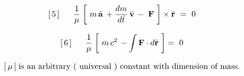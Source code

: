 \documentclass[10pt,fleqn]{article}
\begin{document}
\par \vspace{+0.15em}
\begin{eqnarray*}
\hspace{+1.26em} [\,5\,] \;\;\;\;\;\; \dfrac{1}{\mu} \; \bigg [ \,\, m \, \bar{\mathbf{a}} \, + \dfrac{dm}{d\bar{t}} \, \bar{\mathbf{v}} \, - \; \mathbf{F} \,\, \bigg ] \times \bar{\mathbf{r}} ~=~ 0
\end{eqnarray*}
\par \vspace{+0.15em}
\begin{eqnarray*}
\hspace{+1.26em} [\,6\,] \;\;\;\;\;\; \dfrac{1}{\mu} \; \bigg [ \,\, m \, c^2 \, - \int \mathbf{F} \cdot d\bar{\mathbf{r}} \,\, \bigg ] =~ 0
\end{eqnarray*}
\par \vspace{+0.33em}
\begin{eqnarray*}
\hspace{+1.26em} [\,\mu\,] \; \textrm{is an arbitrary ( universal ) constant with dimension of mass.}
\end{eqnarray*}
\end{document}
